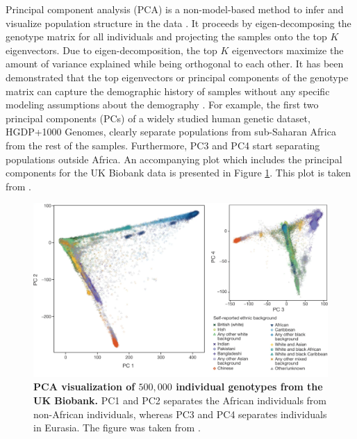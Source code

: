 Principal component analysis (PCA) is a non-model-based method to infer and visualize population structure in the data \cite{menozzi1978synthetic,Patterson2006, Price2006}. It proceeds by eigen-decomposing the genotype matrix for all individuals and projecting the samples onto the top \(K\) eigenvectors. Due to eigen-decomposition, the top \(K\) eigenvectors maximize the amount of variance explained while being orthogonal to each other. It has been demonstrated that the top eigenvectors or principal components of the genotype matrix can capture the demographic history of samples without any specific modeling assumptions about the demography \cite{Patterson2006,novembre2008interpreting}. For example, the first two principal components (PCs) of a widely studied human genetic dataset, HGDP+1000 Genomes, clearly separate populations from sub-Saharan Africa from the rest of the samples. Furthermore, PC3 and PC4 start separating populations outside Africa. An accompanying plot which includes the principal components for the UK Biobank data is presented in Figure \ref{fig:pc_plot}. This plot is taken from \cite{Bycroft2018}.

\begin{figure}[h!]
    \centering
    \includegraphics[width=\linewidth]{figures/thesis_pc_plot.pdf}
    \caption{\textbf{PCA visualization of $500,000$ individual genotypes from the UK Biobank.} PC1 and PC2 separates the African individuals from non-African individuals, whereas PC3 and PC4 separates individuals in Eurasia. The figure was taken from \cite{Bycroft2018}.}
    \label{fig:pc_plot}
\end{figure}

